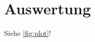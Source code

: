 \section{Auswertung}
\label{sec:Auswertung}

\begin{figure}
  \centering
\end{figure}


Siehe \autoref{fig:plot}!

